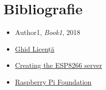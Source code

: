 \chapter*{Bibliografie} 

\begin{itemize}
    \item Author1, \textit{Book1}, 2018
    \item \href{https://profs.info.uaic.ro/~licenta/2019Feb/res/Ghid-LICENTA-2018.pdf}{Ghid Licență}
	\item \href{https://tttapa.github.io/ESP8266/Chap10%20-%20Simple%20Web%20Server.html}{Creating the ESP8266 server}
	\item \href{https://www.raspberrypi.org/}{Raspberry Pi Foundation}
	
	
\end{itemize}